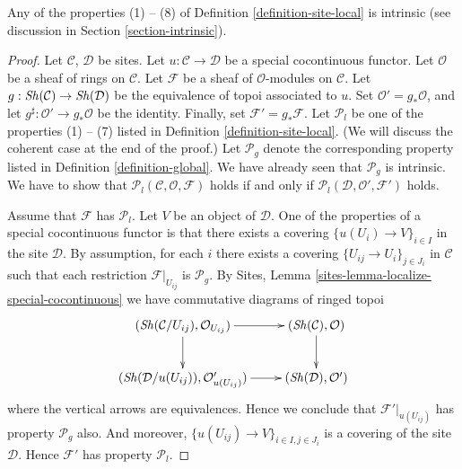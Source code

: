 \begin{lemma}
\label{lemma-special-locally-free}
Any of the properties (1) -- (8) of Definition \ref{definition-site-local}
is intrinsic (see discussion in Section \ref{section-intrinsic}).
\end{lemma}

\begin{proof}
Let $\mathcal{C}$, $\mathcal{D}$ be sites.
Let $u : \mathcal{C} \to \mathcal{D}$ be a special cocontinuous functor.
Let $\mathcal{O}$ be a sheaf of rings on $\mathcal{C}$.
Let $\mathcal{F}$ be a sheaf of $\mathcal{O}$-modules on $\mathcal{C}$.
Let $g : \mathop{\mathit{Sh}}\nolimits(\mathcal{C}) \to \mathop{\mathit{Sh}}\nolimits(\mathcal{D})$
be the equivalence of topoi associated to $u$.
Set $\mathcal{O}' = g_*\mathcal{O}$, and let
$g^\sharp : \mathcal{O}' \to g_*\mathcal{O}$ be the identity.
Finally, set $\mathcal{F}' = g_*\mathcal{F}$.
Let $\mathcal{P}_l$ be one of the properties (1) -- (7) listed in
Definition \ref{definition-site-local}.
(We will discuss the coherent case at the end of the proof.)
Let $\mathcal{P}_g$ denote the corresponding property listed in
Definition \ref{definition-global}. We have already seen that
$\mathcal{P}_g$ is intrinsic.
We have to show that
$\mathcal{P}_l(\mathcal{C}, \mathcal{O}, \mathcal{F})$
holds if and only if
$\mathcal{P}_l(\mathcal{D}, \mathcal{O}', \mathcal{F}')$
holds.

\medskip\noindent
Assume that $\mathcal{F}$ has $\mathcal{P}_l$.
Let $V$ be an object of $\mathcal{D}$.
One of the properties of a special cocontinuous functor is that there exists
a covering $\{u(U_i) \to V\}_{i \in I}$ in the site $\mathcal{D}$.
By assumption, for each $i$ there exists a covering
$\{U_{ij} \to U_i\}_{j \in J_i}$ in $\mathcal{C}$ such that
each restriction $\mathcal{F}|_{U_{ij}}$ is $\mathcal{P}_g$. By
Sites, Lemma \ref{sites-lemma-localize-special-cocontinuous}
we have commutative diagrams of ringed topoi
$$
\xymatrix{
(\Sh(\mathcal{C}/U_{ij}), \mathcal{O}_{U_{ij}}) \ar[r] \ar[d] &
(\Sh(\mathcal{C}), \mathcal{O}) \ar[d] \\
(\Sh(\mathcal{D}/u(U_{ij})), \mathcal{O}'_{u(U_{ij})}) \ar[r] &
(\Sh(\mathcal{D}), \mathcal{O}')
}
$$
where the vertical arrows are equivalences. Hence we conclude that
$\mathcal{F}'|_{u(U_{ij})}$ has property $\mathcal{P}_g$ also.
And moreover, $\{u(U_{ij}) \to V\}_{i \in I, j \in J_i}$ is a
covering of the site $\mathcal{D}$. Hence $\mathcal{F}'$ has
property $\mathcal{P}_l$.


\end{proof}
